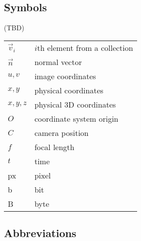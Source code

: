 
\subsection*{Symbols}

(TBD)

\begin{tabular}{ll}
$\vec v_i$	& $i$th element from a collection\\
$\vec n$	& normal vector\\
$u, v$		& image coordinates\\
$x, y$		& physical coordinates\\
$x, y, z$	& physical 3D coordinates\\
$O$			& coordinate system origin\\
$C$			& camera position\\
$f$			& focal length\\
$t$			& time\\
px			& pixel\\
b			& bit\\
B			& byte\\
\end{tabular}
%
%

\subsection*{Abbreviations}

